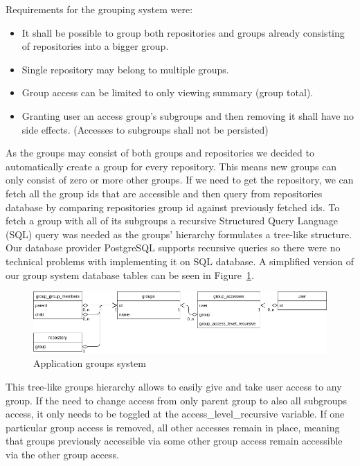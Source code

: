 Requirements for the grouping system were:
\begin{itemize}
    \item It shall be possible to group both repositories and groups already consisting of repositories into a bigger group.
    \item Single repository may belong to multiple groups.
    \item Group access can be limited to only viewing summary (group total).
    \item Granting user an access group's subgroups and then removing it shall have no side effects. (Accesses to subgroups shall not be persisted)
\end{itemize}

As the groups may consist of both groups and repositories we decided to automatically create a group for every repository.
This means new groups can only consist of zero or more other groups.
If we need to get the repository, we can fetch all the group ids that are accessible and then query from repositories database by
comparing repositories group id against previously fetched ids.
To fetch a group with all of its subgroups a recursive Structured Query Language (SQL) query was needed as the groups'
hierarchy formulates a tree-like structure.
Our database provider PostgreSQL supports recursive queries so there were no technical problems with implementing it on SQL database.
A simplified version of our group system database tables can be seen in Figure~\ref{fig:group-system}.

\begin{figure}[h]
    \includegraphics[width=\textwidth]{figures/group_system}
    \caption{Application groups system}
    \label{fig:group-system}
\end{figure}

This tree-like groups hierarchy allows to easily give and take user access to any group.
If the need to change access from only parent group to also all subgroups access, it only needs to be toggled at the access{\_}level{\_}recursive
variable.
If one particular group access is removed, all other accesses remain in place,
meaning that groups previously accessible via some other group access remain accessible via the other group access.

